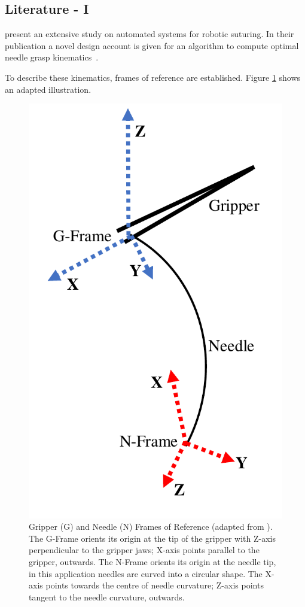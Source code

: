 \documentclass[english]{sobraep}
\begin{document}
\subsection{Literature - I}
\citeauthor{needle-grasp} present an extensive study on automated systems for robotic suturing. In their publication a novel design account is given for an algorithm to compute optimal needle grasp kinematics~\cite{needle-grasp}. 

To describe these kinematics, frames of reference are established. Figure \ref{fig:needle-frames} shows an adapted illustration. 
\begin{figure}[H]
    \centering
    \includegraphics[scale=0.4]{figs/needle-frames.pdf}
    \caption{Gripper (G) and Needle (N) Frames of Reference (adapted from \cite[Figure 2(a)]{needle-grasp}). The G-Frame orients its origin at the tip of the gripper with Z-axis perpendicular to the gripper jaws; X-axis points parallel to the gripper, outwards. The N-Frame orients its origin at the needle tip, in this application needles are curved into a circular shape. The X-axis points towards the centre of needle curvature; Z-axis points tangent to the needle curvature, outwards.}
    \label{fig:needle-frames}
\end{figure}
\end{document}
